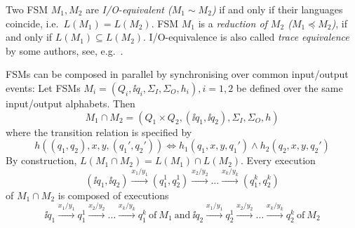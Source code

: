 Two FSM $M_1, M_2$ are \emph{I/O-equivalent ($M_1\sim M_2$)} if and only if their languages coincide, i.e.~$L(M_1) = L(M_2)$. FSM $M_1$ is a \emph{reduction of $M_2$ ($M_1 \preceq M_2$)},
if and only if $L(M_1) \subseteq L(M_2)$. I/O-equivalence is also called 
\emph{trace equivalence} by some authors, see, e.g.~\cite{luo_test_1994}.



FSMs can be composed in parallel by synchronising over common input/output events:
Let FSMs $M_i=(Q_i, \ii{q_i}, \Sigma_I, \Sigma_O,  h_i), i = 1,2$ be defined over
the same input/output alphabets. Then 
$$
M_1 \cap M_2 = (Q_1\times Q_2, (\ii{q_1},\ii{q_2}),\Sigma_I, \Sigma_O, h)
$$
where the transition relation is specified by 
$$
h((q_1,q_2),x,y,(q_1',q_2')) \Leftrightarrow h_1(q_1,x,y,q_1') \wedge h_2(q_2,x,y,q_2')
$$
By construction, $L(M_1 \cap M_2) = L(M_1) \cap L(M_2)$. Every execution 
$$
(\ii{q_1},\ii{q_2}) \xrightarrow{x_1/y_1} (q_1^1,q_2^1) 
\xrightarrow{x_2/y_2} \dots \xrightarrow{x_k/y_k} (q_1^{k},q_2^{k})
$$
of 
$M_1\cap M_2$
is composed of executions 
$$
\ii{q_1} \xrightarrow{x_1/y_1} q_1^1 
\xrightarrow{x_2/y_2} \dots \xrightarrow{x_k/y_k} q_1^{k}\
\text{of}\ M_1\ \text{and}\ 
\ii{q_2} \xrightarrow{x_1/y_1} q_2^1 
\xrightarrow{x_2/y_2} \dots \xrightarrow{x_k/y_k} q_2^{k}\
\text{of}\ M_2
$$


